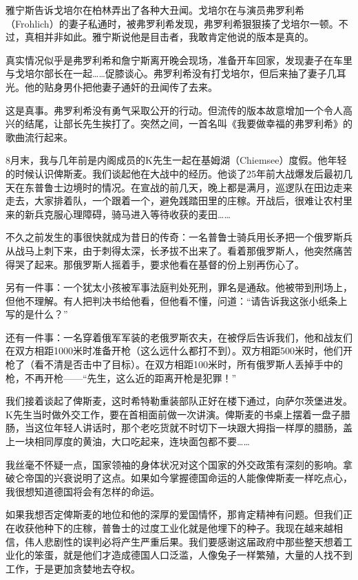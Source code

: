 \documentclass[UTF8]{ctexart}
\begin{document}
雅宁斯告诉戈培尔在柏林弄出了各种大丑闻。戈培尔在与演员弗罗利希（Frohlich）的妻子私通时，被弗罗利希发现，弗罗利希狠狠揍了戈培尔一顿。不过，真相并非如此。雅宁斯说他是目击者，我敢肯定他说的版本是真的。

真实情况似乎是弗罗利希和詹宁斯离开晚会现场，准备开车回家，发现妻子在车里与戈培尔部长在一起……促膝谈心。弗罗利希没有打戈培尔，但后来抽了妻子几耳光。他的贴身男仆把他妻子通奸的丑闻传了去来。

这是真事。弗罗利希没有勇气采取公开的行动。但流传的版本故意增加一个令人高兴的结尾，让部长先生挨打了。突然之间，一首名叫《我要做幸福的弗罗利希》的歌曲流行起来。

8月末，我与几年前是内阁成员的K先生一起在基姆湖（Chiemsee）度假。他年轻的时候认识俾斯麦。我们谈起他在大战中的经历。他谈了25年前大战爆发后最初几天在东普鲁士边境时的情况。在宣战的前几天，晚上都是满月，巡逻队在田边走来走去，大家排着队，一个跟着一个，避免践踏田里的庄稼。开战后，很难让农村里来的新兵克服心理障碍，骑马进入等待收获的麦田……

不久之前发生的事很快就成为昔日的传奇：一名普鲁士骑兵用长矛把一个俄罗斯兵从战马上刺下来，由于刺得太深，长矛拔不出来了。看着那俄罗斯人，他突然痛苦得哭了起来。那俄罗斯人摇着手，要求他看在基督的份上别再伤心了。

另有一件事：一个犹太小孩被军事法庭判处死刑，罪名是通敌。他被带到刑场上，但他不理解。有人把判决书给他看，但他看不懂，问道：“请告诉我这张小纸条上写的是什么？”

还有一件事：一名穿着俄军军装的老俄罗斯农夫，在被俘后告诉我们，他和战友们在双方相距1000米时准备开枪（这么远什么都打不到）。双方相距500米时，他们开枪了（看不清是否击中了目标）。在双方相距100米时，所有俄罗斯人丢掉手中的枪，不再开枪——“先生，这么近的距离开枪是犯罪！”

我们接着谈起了俾斯麦，这时希特勒重装部队正好在楼下通过，向萨尔茨堡进发。K先生当时做外交工作，要在首相面前做一次讲演。俾斯麦的书桌上摆着一盘子腊肠，当这位年轻人讲话时，那个老吃货就不时切下一块跟大拇指一样厚的腊肠，盖上一块相同厚度的黄油，大口吃起来，连块面包都不要……

我丝毫不怀疑一点，国家领袖的身体状况对这个国家的外交政策有深刻的影响。拿破仑帝国的兴衰说明了这点。如果如今掌握德国命运的人能像俾斯麦一样吃点心，我很想知道德国将会有怎样的命运。

如果我想否定俾斯麦的地位和他的深厚的爱国情怀，那肯定精神有问题。但我们正在收获他种下的庄稼，普鲁士的过度工业化就是他埋下的种子。我现在越来越相信，伟人悲剧性的误判必将产生严重后果。我们要感谢这届政府中那些整天想着工业化的笨蛋，就是他们才造成德国人口泛滥，人像兔子一样繁殖，大量的人找不到工作，于是更加贪婪地去夺权。
\end{document}
